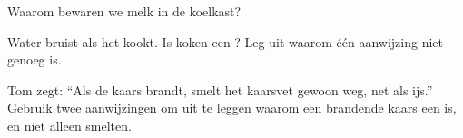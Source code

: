 \begin{exercise}[$\star$]\label{exo:g5:irreversible-changes:9}
Waarom bewaren we melk in de koelkast?
\end{exercise}

\begin{exercise}[$\star\star$]\label{exo:g5:irreversible-changes:10}
Water bruist als het kookt. Is koken een ? Leg uit
waarom één aanwijzing niet genoeg is.
\end{exercise}

\begin{exercise}[$\star\star$]\label{exo:g5:irreversible-changes:11}
Tom zegt: ``Als de kaars brandt, smelt het kaarsvet gewoon weg, net als
ijs.'' Gebruik twee aanwijzingen om uit te leggen waarom een brandende
kaars een  is, en niet alleen smelten.
\end{exercise}
